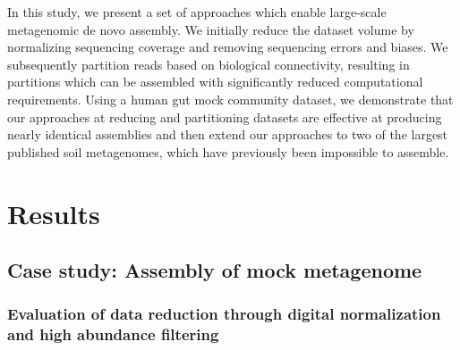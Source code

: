 \documentclass[11pt]{article} %
\begin{document}
In this study, we present a set of approaches which enable large-scale metagenomic de novo assembly.  We initially reduce the dataset volume by normalizing sequencing coverage and removing sequencing errors and biases.  We subsequently partition reads based on biological connectivity, resulting in partitions which can be assembled with significantly reduced computational requirements.   Using a human gut mock community dataset, we demonstrate that our approaches at reducing and partitioning datasets are effective at producing nearly identical assemblies and then extend our approaches to two of the largest published soil metagenomes, which have previously been impossible to assemble. 

\section{Results}

\subsection{Case study:  Assembly of mock metagenome}

\subsubsection{Evaluation of data reduction through digital normalization and high abundance filtering}
\end{document}
